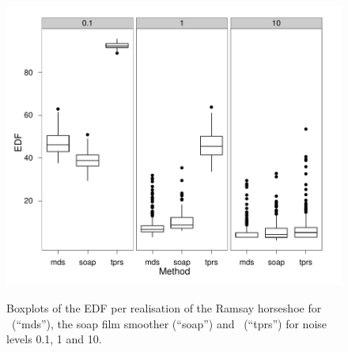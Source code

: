 \begin{figure}
\centering
\includegraphics[width=6in]{mds/figs/edf-mds-ramsay-boxplot.pdf} \\
\caption{Boxplots of the EDF per realisation of the Ramsay horseshoe for \mdsap\ (``mds''), the soap film smoother (``soap'') and \tprs\ (``tprs'') for noise levels 0.1, 1 and 10.}
\label{edf-mds-ramsay-boxplot}
\end{figure}

